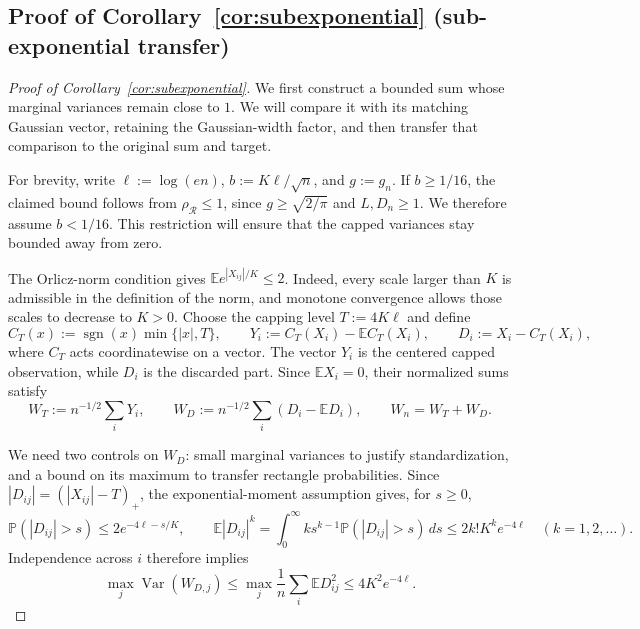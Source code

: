 \documentclass[11pt,letterpaper]{article}
\theoremstyle{remark}
\newcommand{\E}{\mathbb E}
\newcommand{\Pp}{\mathbb P}
\newcommand{\Var}{\operatorname{Var}}
\newcommand{\rh}{\rho_{\mathcal R}}
\begin{document}
\subsection{Proof of Corollary~\ref*{cor:subexponential} (sub-exponential transfer)}\label{app:subexponential}
\begin{proof}[Proof of Corollary~\ref{cor:subexponential}]
We first construct a bounded sum whose marginal variances remain close
to $1$. We will compare it with its matching Gaussian vector, retaining
the Gaussian-width factor, and then transfer that comparison to the
original sum and target.

For brevity, write $\ell:=\log(en)$, $b:=K\ell/\sqrt n$, and $g:=g_n$.
If $b\ge1/16$, the claimed bound follows from $\rh\le1$, since
$g\ge\sqrt{2/\pi}$ and $L,D_n\ge1$. We therefore assume $b<1/16$.
This restriction will ensure that the capped variances stay bounded
away from zero.

The Orlicz-norm condition gives $\E e^{|X_{ij}|/K}\le2$.
Indeed, every scale larger than $K$ is admissible in the definition
of the norm, and monotone convergence allows those scales to decrease
to $K>0$. Choose the capping level $T:=4K\ell$ and define
\[
 C_T(x):=\operatorname{sgn}(x)\min\{|x|,T\},\qquad
 Y_i:=C_T(X_i)-\E C_T(X_i),\qquad D_i:=X_i-C_T(X_i),
\]
where $C_T$ acts coordinatewise on a vector.
The vector $Y_i$ is the centered capped observation, while $D_i$
is the discarded part. Since $\E X_i=0$, their normalized sums satisfy
\[
 W_T:=n^{-1/2}\sum_iY_i,\qquad
 W_D:=n^{-1/2}\sum_i(D_i-\E D_i),\qquad W_n=W_T+W_D.
\]

We need two controls on $W_D$: small marginal variances to justify
standardization, and a bound on its maximum to transfer rectangle
probabilities. Since $|D_{ij}|=(|X_{ij}|-T)_+$, the exponential-moment
assumption gives, for $s\ge0$,
\[
 \Pp(|D_{ij}|>s)\le2e^{-4\ell-s/K},\qquad
 \E|D_{ij}|^k
 =\int_0^\infty ks^{k-1}\Pp(|D_{ij}|>s)\,ds
\le2k!K^ke^{-4\ell}\quad(k=1,2,\ldots).
\]
Independence across $i$ therefore implies
\begin{equation}
 \max_j\Var(W_{D,j})
 \le\max_j\frac1n\sum_i\E D_{ij}^2\le4K^2e^{-4\ell}.
 \label{tail:residual-moments}
\end{equation}


\end{proof}
\end{document}
